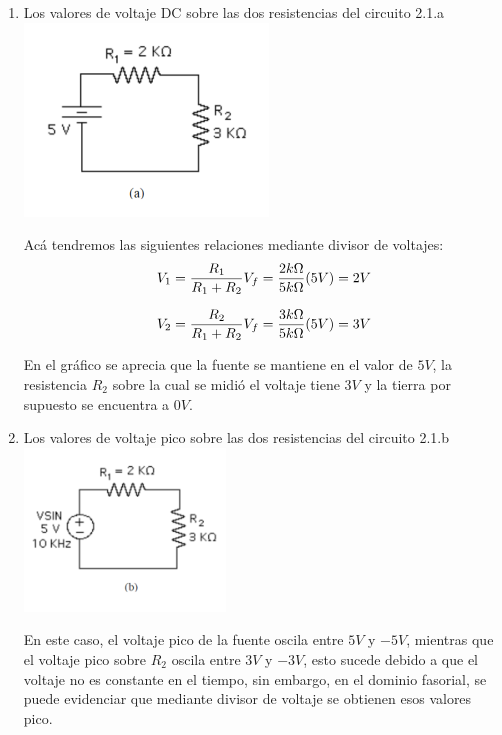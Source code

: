 \documentclass[12pt]{article}
\begin{document}
	\begin{enumerate}
		\item Los valores de voltaje DC sobre las dos resistencias del circuito 2.1.a\\
		
		\includegraphics{Img/2_1_a}
		
		\noindent Acá tendremos las siguientes relaciones mediante divisor de voltajes:\\
		
		\begin{equation}
			\notag V_1 = \frac{R_1}{R_1 + R_2} V_f = \frac{2k\Omega}{5k\Omega}(5V) = 2V
		\end{equation}
	
		\begin{equation}
			\notag V_2 = \frac{R_2}{R_1 + R_2} V_f = \frac{3k\Omega}{5k\Omega}(5V) = 3V
		\end{equation}
	
		\noindent En el gráfico se aprecia que la fuente se mantiene en el valor de $5V$, la resistencia $R_2$ sobre la cual se midió el voltaje tiene $3V$ y la tierra por supuesto se encuentra a $0V$.
		
		\item Los valores de voltaje pico sobre las dos resistencias del circuito 2.1.b\\
		
		\includegraphics{Img/2_1_b}
		
		\noindent En este caso, el voltaje pico de la fuente oscila entre $5V$ y $-5V$, mientras que el voltaje pico sobre $R_2$ oscila entre $3V$ y $-3V$, esto sucede debido a que el voltaje no es constante en el tiempo, sin embargo, en el dominio fasorial, se puede evidenciar que mediante divisor de voltaje se obtienen esos valores pico.
		

\end{enumerate}
\end{document}
